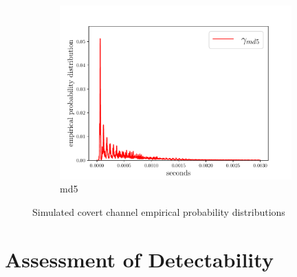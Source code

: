 \documentclass[12pt,a4paper,automark, toc=bib]{scrreprt}
\theoremstyle{definition}
\begin{document}
\begin{figure}
			\centering
			\begin{subfigure}{0.5\textwidth}
				\includegraphics[width=0.98\textwidth]{figures/_CC_compare_completeopenssl_md5_cc_0_light.pdf}
				\caption{md5}
			\end{subfigure}
			
			
			\caption{Simulated covert channel empirical probability distributions}
			\label{cc-fig}
		\end{figure}
			
			
		
		\section{Assessment of Detectability}	
			
\end{document}
